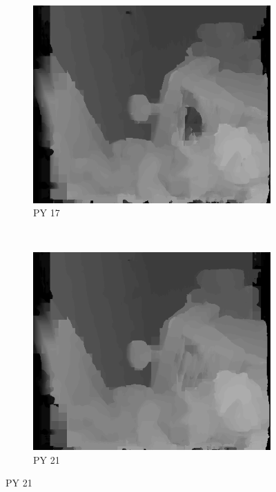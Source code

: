 \begin{figure}
\begin{subfigure}[b]{0.23\textwidth}
    \centering
    \includegraphics[width=\textwidth]{images/stereo-pairs/teddy_pyramid_17.png}
    \caption{PY 17}
  \end{subfigure}
  ~
  \begin{subfigure}[b]{0.23\textwidth}
    \centering
    \includegraphics[width=\textwidth]{images/stereo-pairs/teddy_pyramid_21.png}
    \caption{PY 21}
  \end{subfigure}


\end{figure}
